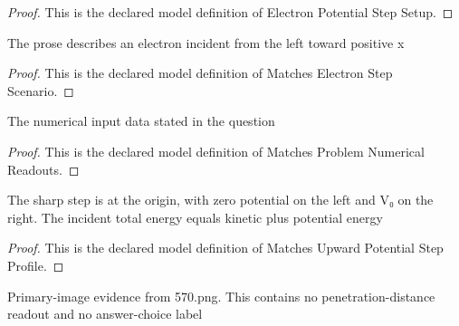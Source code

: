 \begin{proof}
  This is the declared model definition of Electron Potential Step Setup.
\end{proof}
\begin{definition}
  \label{def:physics:phyx-mini-0570:phyxminiproblems-problemphyxmini0570-matcheselectronstepscenario}
  The prose describes an electron incident from the left toward positive x
\end{definition}
\begin{proof}
  This is the declared model definition of Matches Electron Step Scenario.
\end{proof}
\begin{definition}
  \label{def:physics:phyx-mini-0570:phyxminiproblems-problemphyxmini0570-matchesproblemnumericalreadouts}
  The numerical input data stated in the question
\end{definition}
\begin{proof}
  This is the declared model definition of Matches Problem Numerical Readouts.
\end{proof}
\begin{definition}
  \label{def:physics:phyx-mini-0570:phyxminiproblems-problemphyxmini0570-matchesupwardpotentialstepprofile}
  The sharp step is at the origin, with zero potential on the left and V₀ on the right. The incident total energy equals kinetic plus potential energy
\end{definition}
\begin{proof}
  This is the declared model definition of Matches Upward Potential Step Profile.
\end{proof}
\begin{definition}
  \label{def:physics:phyx-mini-0570:phyxminiproblems-problemphyxmini0570-matchessuppliedpotentialstepfigure}
  Primary-image evidence from 570.png. This contains no penetration-distance readout and no answer-choice label
\end{definition}
